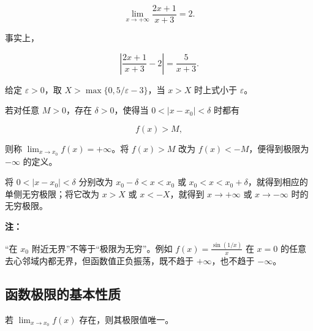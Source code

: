 \documentclass[fontset=fandol]{ctexart}
\newenvironment{warning}{\par\noindent\textbf{注：}\quad}{\par\vspace{0.8em}}
\begin{document}
\begin{example}

\[

\lim_{x\to+\infty}\frac{2x+1}{x+3}=2.

\]

事实上，

\[

\left|\frac{2x+1}{x+3}-2\right|=\frac5{x+3}.

\]

给定 \(\varepsilon>0\)，取 \(X>\max\{0,5/\varepsilon-3\}\)，当 \(x>X\) 时上式小于 \(\varepsilon\)。

\end{example}



\begin{definition}[无穷极限]

若对任意 \(M>0\)，存在 \(\delta>0\)，使得当 \(0<|x-x_0|<\delta\) 时都有

\[

f(x)>M,

\]

则称 \(\lim_{x\to x_0}f(x)=+\infty\)。将 \(f(x)>M\) 改为 \(f(x)<-M\)，便得到极限为 \(-\infty\) 的定义。



将 \(0<|x-x_0|<\delta\) 分别改为 \(x_0-\delta<x<x_0\) 或 \(x_0<x<x_0+\delta\)，就得到相应的单侧无穷极限；将它改为 \(x>X\) 或 \(x<-X\)，就得到 \(x\to+\infty\) 或 \(x\to-\infty\) 时的无穷极限。

\end{definition}



\begin{warning}

“在 \(x_0\) 附近无界”不等于“极限为无穷”。例如 \(f(x)=\frac{\sin(1/x)}{x}\) 在 \(x=0\) 的任意去心邻域内都无界，但函数值正负振荡，既不趋于 \(+\infty\)，也不趋于 \(-\infty\)。

\end{warning}



\subsection{函数极限的基本性质}



\begin{theorem}[极限的唯一性]

若 \(\lim_{x\to x_0}f(x)\) 存在，则其极限值唯一。

\end{theorem}
\end{document}
